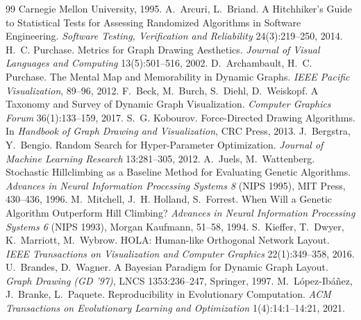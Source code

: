 \documentclass[11pt]{article}
\begin{document}
\begin{thebibliography}{99}
 Carnegie Mellon University, 1995.
 A.~Arcuri, L.~Briand. A Hitchhiker's Guide to Statistical Tests for
 Assessing Randomized Algorithms in Software Engineering. \emph{Software Testing,
 Verification and Reliability} 24(3):219--250, 2014.
 H.~C. Purchase. Metrics for Graph Drawing Aesthetics. \emph{Journal
 of Visual Languages and Computing} 13(5):501--516, 2002.
 D.~Archambault, H.~C. Purchase. The Mental Map and Memorability
 in Dynamic Graphs. \emph{IEEE Pacific Visualization}, 89--96, 2012.
 F.~Beck, M.~Burch, S.~Diehl, D.~Weiskopf. A Taxonomy and Survey of
 Dynamic Graph Visualization. \emph{Computer Graphics Forum} 36(1):133--159, 2017.
 S.~G. Kobourov. Force-Directed Drawing Algorithms. In \emph{Handbook
 of Graph Drawing and Visualization}, CRC Press, 2013.
 J.~Bergstra, Y.~Bengio. Random Search for Hyper-Parameter
 Optimization. \emph{Journal of Machine Learning Research} 13:281--305, 2012.
 A.~Juels, M.~Wattenberg. Stochastic Hillclimbing as a Baseline Method for
 Evaluating Genetic Algorithms. \emph{Advances in Neural Information Processing Systems 8}
 (NIPS 1995), MIT Press, 430--436, 1996.
 M.~Mitchell, J.~H. Holland, S.~Forrest. When Will a Genetic Algorithm
 Outperform Hill Climbing? \emph{Advances in Neural Information Processing Systems 6}
 (NIPS 1993), Morgan Kaufmann, 51--58, 1994.
 S.~Kieffer, T.~Dwyer, K.~Marriott, M.~Wybrow. HOLA: Human-like Orthogonal
 Network Layout. \emph{IEEE Transactions on Visualization and Computer Graphics}
 22(1):349--358, 2016.
 U.~Brandes, D.~Wagner. A Bayesian Paradigm for Dynamic Graph Layout.
 \emph{Graph Drawing (GD '97)}, LNCS 1353:236--247, Springer, 1997.
 M.~L\'opez-Ib\'a\~nez, J.~Branke, L.~Paquete. Reproducibility in
 Evolutionary Computation. \emph{ACM Transactions on Evolutionary Learning and
 Optimization} 1(4):14:1--14:21, 2021.
\end{thebibliography}
\end{document}
